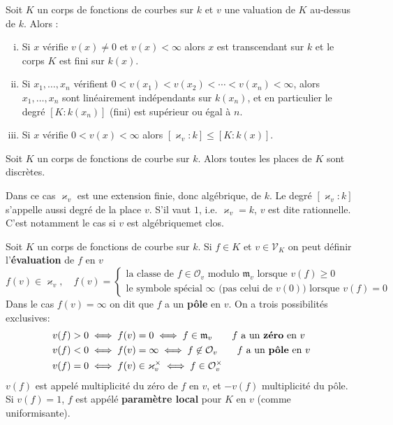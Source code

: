 	\begin{lem}
		Soit $K$ un corps de fonctions de courbes sur $k$ et $v$ une valuation de $K$ au-dessus de $k$.
		Alors :
		\begin{enumerate}[(i)]
			\item Si $x$ vérifie $v(x) \neq 0$ et $v(x) < \infty$ alors $x$ est transcendant sur $k$ et le corps $K$ est fini sur $k(x)$.
			\item Si $x_1,\ldots,x_n$ vérifient $0 < v(x_1) < v(x_2) < \cdots < v(x_n) < \infty$, alors $x_1,\ldots,x_n$ sont linéairement indépendants sur $k(x_n)$, et en particulier le degré $[K : k(x_n)]$ (fini) est supérieur ou égal à $n$.
			\item Si $x$ vérifie $0 < v(x) < \infty$ alors $[\varkappa_v : k] \leq [K : k(x)]$.
		\end{enumerate}
	\end{lem}

	\begin{pop}
		Soit $K$ un corps de fonctions de courbe sur $k$.
		Alors toutes les places de $K$ sont discrètes.
	\end{pop}

	Dans ce cas $\varkappa_v$ est une extension finie, donc algébrique, de $k$.
	Le degré $[\varkappa_v : k]$ s'appelle aussi degré de la place $v$.
	S'il vaut $1$, i.e. $\varkappa_v = k$, $v$ est dite rationnelle.
	C'est notamment le cas si $v$ est algébriquemet clos.
	
	\begin{defn}
		Soit $K$ un corps de fonctions de courbe sur $k$.
		Si $f \in K$ et $v \in \mathscr{V}_K$ on peut définir l'\textbf{évaluation} de $f$ en $v$
		$$f(v) \in \varkappa_v, \quad f(v) = \left\{ \begin{array}{l}
			\text{la classe de $f \in \mathcal{O}_v$ modulo $\mathfrak{m}_v$ lorsque $v(f) \geq 0$} \\
			\text{le symbole spécial $\infty$ (pas celui de $v(0)$) lorsque $v(f) = 0$}
			\end{array} \right.$$
		Dans le cas $f(v) = \infty$ on dit que $f$ a un \textbf{pôle} en $v$.
		On a trois possibilités exclusives:
		\begin{align*}
			v(f) > 0 & \iff f(v) = 0 \iff f \in \mathfrak{m}_v \qquad \text{$f$ a un \textbf{zéro} en $v$} \\
			v(f) < 0 & \iff f(v) = \infty \iff f \not\in \mathcal{O}_v \qquad \text{$f$ a un \textbf{pôle} en $v$} \\
			v(f) = 0 & \iff f(v) \in \varkappa_v^\times \iff f \in \mathcal{O}_v^\times
		\end{align*}
		$v(f)$ est appelé multiplicité du zéro de $f$ en $v$, et $-v(f)$ multiplicité du pôle.
		Si $v(f) = 1$, $f$ est appélé \textbf{paramètre local} pour $K$ en $v$ (comme uniformisante).
	\end{defn}

